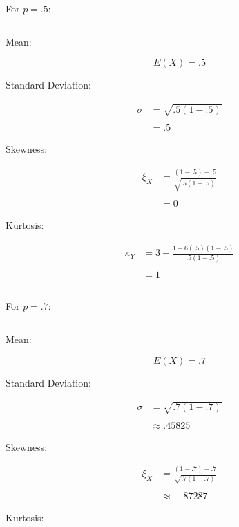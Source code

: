 \documentclass{article}\usepackage[]{graphicx}\usepackage[]{color}
\begin{document}
\begin{enumerate}
\begin{enumerate}
\[
\]

For $p=.5$:

\[
\]

Mean:

\[
E(X)=.5
\]

Standard Deviation:

\begin{align*}\sigma & =\sqrt{.5\left(1-.5\right)}\\
\\
 & =.5
\end{align*}

Skewness:

\begin{align*}\xi_{X} & =\frac{\left(1-.5\right)-.5}{\sqrt{.5\left(1-.5\right)}}\\
\\
 & =0
\end{align*}

Kurtosis:

\begin{align*}\kappa_{Y} & =3+\frac{1-6\left(.5\right)\left(1-.5\right)}{.5\left(1-.5\right)}\\
\\
 & =1
\end{align*}

\[
\]

For $p=.7$:

\[
\]

Mean:

\[
E(X)=.7
\]

Standard Deviation:

\begin{align*}\sigma & =\sqrt{.7\left(1-.7\right)}\\
\\
 & \approx.45825
\end{align*}

Skewness:

\begin{align*}\xi_{X} & =\frac{\left(1-.7\right)-.7}{\sqrt{.7\left(1-.7\right)}}\\
\\
 & \approx-.87287
\end{align*}

Kurtosis:


\end{enumerate}
\end{enumerate}
\end{document}
